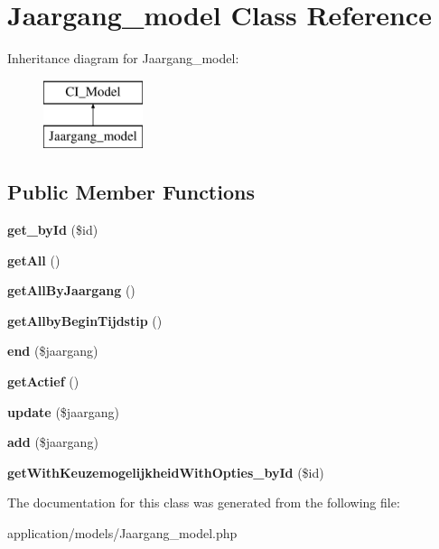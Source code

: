 \hypertarget{class_jaargang__model}{}\section{Jaargang\+\_\+model Class Reference}
\label{class_jaargang__model}
Inheritance diagram for Jaargang\+\_\+model\+:\begin{figure}[H]
\begin{center}
\leavevmode
\includegraphics[height=2.000000cm]{class_jaargang__model}
\end{center}
\end{figure}
\subsection*{Public Member Functions}
\begin{DoxyCompactItemize}
\item 
\mbox{\label{class_jaargang__model_a98d28a4d9a29d40c5a8aa0176f19a919}} 
{\bfseries get\+\_\+by\+Id} (\$id)
\item 
\mbox{\label{class_jaargang__model_aba0d5b303383fb5b1fabb5fd01cd3800}} 
{\bfseries get\+All} ()
\item 
\mbox{\label{class_jaargang__model_a55976d021ef90b90b080cd7daa1e318f}} 
{\bfseries get\+All\+By\+Jaargang} ()
\item 
\mbox{\label{class_jaargang__model_a6e4ef32a886b1cb2774da0b879ac49cd}} 
{\bfseries get\+Allby\+Begin\+Tijdstip} ()
\item 
\mbox{\label{class_jaargang__model_a696e5350ea9e59a460530ab447486539}} 
{\bfseries end} (\$jaargang)
\item 
\mbox{\label{class_jaargang__model_aa00f1c12aa0757cc832dcb70c8b13128}} 
{\bfseries get\+Actief} ()
\item 
\mbox{\label{class_jaargang__model_a95dd2c7c418df525016de428cc3d1743}} 
{\bfseries update} (\$jaargang)
\item 
\mbox{\label{class_jaargang__model_a85632de012fc6908d7099ed42afd5fe2}} 
{\bfseries add} (\$jaargang)
\item 
\mbox{\label{class_jaargang__model_a4cee3ea918a63f7849b377135e365d35}} 
{\bfseries get\+With\+Keuzemogelijkheid\+With\+Opties\+\_\+by\+Id} (\$id)
\end{DoxyCompactItemize}


The documentation for this class was generated from the following file\+:\begin{DoxyCompactItemize}
\item 
application/models/Jaargang\+\_\+model.\+php\end{DoxyCompactItemize}
